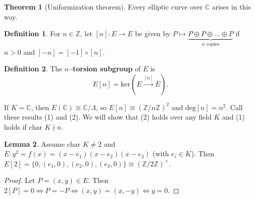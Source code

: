 \documentclass{article}
\theoremstyle{definition}
\newtheorem{theorem}{Theorem}[section]
\newtheorem{lemma}[theorem]{Lemma}
\newtheorem{defn}{Definition}[section]
\begin{document}
\begin{theorem}[Uniformization theorem]
    Every elliptic curve over $\mathbb{C}$ arises in this way.
\end{theorem}
\begin{defn}
    For $n \in \mathbb{Z}$, let $[n]: E \to E$ be given by $P \mapsto \underbrace{P\oplus P \oplus \ldots \oplus P}_{n\text{ copies}}$ if $n>0$ and $[-n] = [-1] \circ [n]$.
\end{defn}
\begin{defn}
    The \textbf{$n$--torsion subgroup} of $E$ is \[
    E[n] = \text{ker}(E \stackrel{[n]}{\longrightarrow} E).
    \]
\end{defn}
If $K=\mathbb{C}$, then $E(\mathbb{C}) \cong \mathbb{C}/\Lambda$, so $E[n] \cong (\mathbb{Z}/n\mathbb{Z})^2$ and $\text{deg}[n] = n^2$. Call these results (1) and (2). We will show that (2) holds over any field $K$ and (1) holds if $\text{char }K \nmid n$.
\begin{lemma}\label{lemma4.6}
    Assume $\text{char }K \neq 2$ and $E: y^2=f(x)=(x-e_1)(x-e_2)(x-e_3)$ (with $e_i \in \overline{K}$). Then $E[2] = \{0, (e_1,0), (e_2,0), (e_3,0)\} \cong (\mathbb{Z}/2\mathbb{Z})^\times$.
\end{lemma}
\begin{proof}
    Let $P = (x,y) \in E$. Then $2[P] = 0 \iff P = -P \iff (x,y) = (x,-y) \iff y=0$.
\end{proof}
\end{document}
